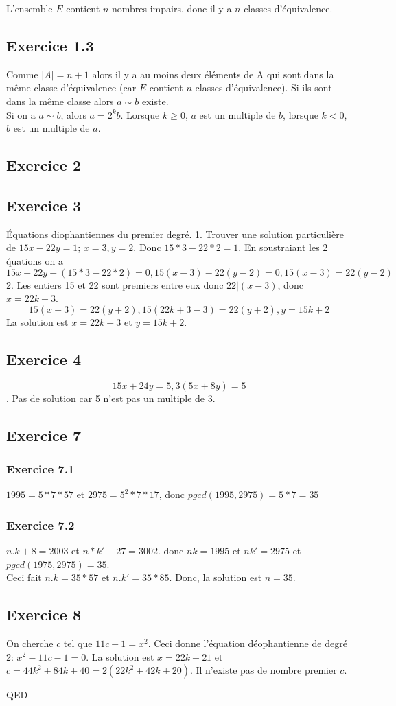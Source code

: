 \documentclass[]{book}
\theoremstyle{definition}
\begin{document}
L'ensemble $E$ contient $n$ nombres impairs, donc il y a $n$ classes d'\'equivalence.

\subsection*{Exercice 1.3}
Comme $|A| = n+1$ alors il y a au moins deux \'el\'ements de A qui sont dans la m\^eme classe d'\'equivalence (car $E$ contient $n$ classes d'\'equivalence). Si ils sont dans la m\^eme classe alors $a \sim b$ existe.\\

Si on a $a \sim b$, alors $a=2^kb$. Lorsque $k\geq 0$, $a$ est un multiple de $b$, lorsque $k<0$, $b$ est un multiple de $a$.

\subsection*{Exercice 2}

\subsection*{Exercice 3}
\'Equations diophantiennes du premier degr\'e.
1. Trouver une solution particuli\`ere de $15x - 22y = 1$; $x=3, y=2$. Donc $15*3-22*2 = 1$. En soustraiant les 2 \'quations on a 
$$15x - 22y - (15*3-22*2) = 0, 15(x-3) - 22(y-2) = 0, 15(x-3) = 22(y-2)$$
2. Les entiers 15 et 22 sont premiers entre eux donc $22|(x-3)$, donc $x= 22k+3$.
$$15(x-3) = 22(y+2), 15(22k+3-3) = 22(y+2), y = 15k+2$$
La solution est $x=22k+3$ et $y=15k+2$.

\subsection*{Exercice 4}
$$15x+24y = 5, 3(5x+8y) = 5$$.
Pas de solution car 5 n'est pas un multiple de 3.


\subsection*{Exercice 7}
\subsubsection*{Exercice 7.1}
$1995 = 5*7*57$ et $2975 = 5^2*7*17$, donc $pgcd(1995,2975) = 5*7 = 35$

\subsubsection*{Exercice 7.2}
$n.k+8 = 2003$ et $n*k' + 27 = 3002$. donc $nk=1995$ et $nk'=2975$ et $pgcd(1975,2975) = 35$.\\
Ceci fait $n.k=35*57$ et $n.k'=35*85$. Donc, la solution est $n=35$.  	
 

\subsection*{Exercice 8}
On cherche $c$ tel que $11c+1 = x^2$. Ceci donne l'\'equation d\'eophantienne de degr\'e 2: $x^2 -11c-1 = 0$.
La solution est $x=22k+21$ et $c=44k^2+84k+40=2(22k^2+42k+20)$. 
Il n'existe pas de nombre premier $c$.

QED
\end{document}
